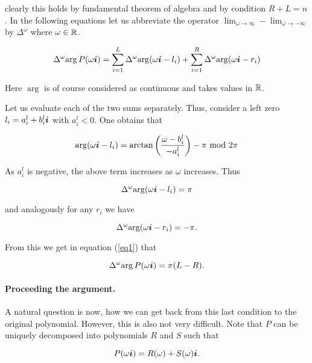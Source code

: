 \message{ !name(On The Routh-Hurwitz Theorem.tex)}\documentclass[10pt,a4paper]{article}
\begin{document}
clearly this holds by fundamental theorem of algebra and by condition $R+L=n$. In the following equations let us abbreviate the operator $\lim_{\omega\to\infty}-\lim_{\omega\to-\infty}$ by $\Delta^\omega$ where $\omega\in\mathbb{R}$.

\begin{equation}
\Delta^\omega{\arg{P(\omega\boldsymbol{i})}} = \sum_{i=1}^L{\Delta^\omega{\arg(\omega\boldsymbol{i}-l_i)}}+\sum_{i=1}^R{\Delta^\omega{\arg(\omega\boldsymbol{i}-r_i)}}\label{eq1}
\end{equation}

Here $\arg$ is of course considered as continuous and takes values in $\mathbb{R}$.

Let us evaluate each of the two sums separately. Thus, consider a left zero $l_i=a^l_i+b^l_i\boldsymbol{i}$ with $a^l_i<0$. One obtains that

\begin{equation}
\arg(\omega\boldsymbol{i}-l_i)=\arctan\left(\frac{\omega-b^l_i}{-a^l_i}\right)-\pi \text{ mod }2\pi
\end{equation}

As $a^l_i$ is negative, the above term increases as $\omega$ increases. Thus

\begin{equation}
\Delta^\omega{\arg(\omega\boldsymbol{i}-l_i)}=\pi
\end{equation}

and analogously for any $r_i$ we have

\begin{equation}
\Delta^\omega{\arg(\omega\boldsymbol{i}-r_i)}=-\pi\text{.}
\end{equation}

From this we get in equation (\ref{eq1}) that

\begin{equation}
\Delta^\omega{\arg{P(\omega\boldsymbol{i})}} = \pi(L-R)\text{.}\label{eq2}
\end{equation}

\paragraph{Proceeding the argument.} A natural question is now, how we can get back from this last condition to the original polynomial. However, this is also not very difficult. Note that $P$ can be uniquely decomposed into polynomials $R$ and $S$ such that

\begin{equation}
P(\omega\boldsymbol{i}) = R(\omega)+S(\omega)\boldsymbol{i}\text{.}
\end{equation}
\end{document}
